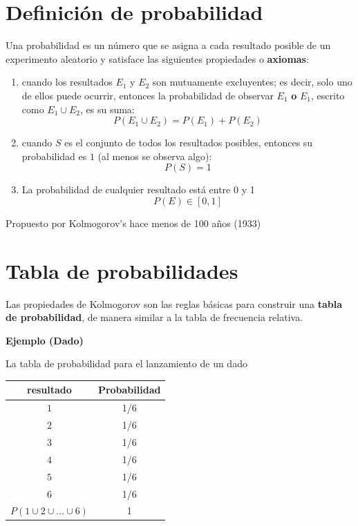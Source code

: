 \documentclass[
]{book}
\providecommand{\tightlist}{%
  \setlength{\itemsep}{0pt}\setlength{\parskip}{0pt}}
\begin{document}
\hypertarget{definiciuxf3n-de-probabilidad}{%
\section{Definición de probabilidad}\label{definiciuxf3n-de-probabilidad}}

Una probabilidad es un número que se asigna a cada resultado posible de un experimento aleatorio y satisface las siguientes propiedades o \textbf{axiomas}:

\begin{enumerate}
\def\labelenumi{\arabic{enumi})}
\tightlist
\item
  cuando los resultados \(E_1\) y \(E_2\) son mutuamente excluyentes; es decir, solo uno de ellos puede ocurrir, entonces la probabilidad de observar \(E_1\) \textbf{o} \(E_1\), escrito como \(E_1\cup E_2\), es su suma:
  \[P(E_1\cup E_2) = P(E_1) + P(E_2)\]
\item
  cuando \(S\) es el conjunto de todos los resultados posibles, entonces su probabilidad es \(1\) (al menos se observa algo): \[P(S)=1\]
\item
  La probabilidad de cualquier resultado está entre 0 y 1 \[P(E) \in [0,1]\]
\end{enumerate}

Propuesto por Kolmogorov's hace menos de 100 años (1933)

\hypertarget{tabla-de-probabilidades}{%
\section{Tabla de probabilidades}\label{tabla-de-probabilidades}}

Las propiedades de Kolmogorov son las reglas básicas para construir una \textbf{tabla de probabilidad}, de manera similar a la tabla de frecuencia relativa.

\textbf{Ejemplo (Dado)}

La tabla de probabilidad para el lanzamiento de un dado

\begin{longtable}[]{@{}cc@{}}
\toprule\noalign{}
resultado & Probabilidad \\
\midrule\noalign{}
\endhead
\bottomrule\noalign{}
\endlastfoot
\(1\) & 1/6 \\
\(2\) & 1/6 \\
\(3\) & 1/6 \\
\(4\) & 1/6 \\
\(5\) & 1/6 \\
\(6\) & 1/6 \\
\(P(1 \cup 2\cup ... \cup 6)\) & 1 \\
\end{longtable}
\end{document}
